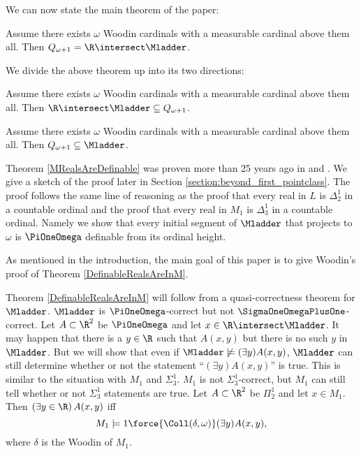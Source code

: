 \documentclass[oneside,12pt]{amsart}
\begin{document}
We can now state the main theorem of the paper:

\begin{theorem}
Assume there exists $\omega$ Woodin cardinals with a measurable cardinal above them all.
Then $Q_{\omega+1} = \R \intersect \Mladder$.
\end{theorem}

We divide the above theorem up into its two directions:

\begin{theorem}
\label{MRealsAreDefinable}
Assume there exists $\omega$ Woodin cardinals with a measurable cardinal above them all.
Then $\R \intersect \Mladder \subseteq Q_{\omega+1}$.
\end{theorem}

\begin{theorem}
\label{DefinableRealsAreInM}
Assume there exists $\omega$ Woodin cardinals with a measurable cardinal above them all.
Then $Q_{\omega+1} \subseteq \Mladder$.
\end{theorem}

Theorem \ref{MRealsAreDefinable} was proven more than 25 years ago in
\cite{My_Thesis} and \cite{Mouse_Sets}. We give a sketch of the proof later
in Section \ref{section:beyond_first_pointclass}. The proof follows the same
line of reasoning as the proof that every real in $L$ is $\Delta^1_2$ in a
countable ordinal and the proof that every real in $M_1$ is $\Delta^1_3$ in
a countable ordinal. Namely we show that every initial segment of $\Mladder$
that projects to $\omega$ is $\PiOneOmega$ definable from its ordinal height.

As mentioned in the introduction, the main goal of this paper is to give Woodin's proof of Theorem \ref{DefinableRealsAreInM}.

Theorem \ref{DefinableRealsAreInM} will follow from a quasi-correctness theorem
for $\Mladder$. $\Mladder$ is $\PiOneOmega$-correct but not $\SigmaOneOmegaPlusOne$-correct.
Let $A\subset\R^2$ be $\PiOneOmega$ and let $x\in\R\intersect\Mladder$. It may
happen that there is a $y\in \R$ such that $A(x,y)$ but there is no such $y$
in $\Mladder$. But we will show that even if $\Mladder\not\models(\exists y) A(x,y)$,
$\Mladder$ can still determine whether or not the statement
``$(\exists y) A(x,y)$'' is true. This is similar to the situation with $M_1$ and
$\Sigma^1_3$. $M_1$ is not $\Sigma^1_3$-correct, but $M_1$ can still tell whether
or not $\Sigma^1_3$ statements are true. Let $A\subset\R^2$ be $\Pi^1_2$ and
let $x\in M_1$. Then $(\exists y\in\R)\, A(x,y)$ iff
$$M_1\models 1\force{\Coll(\delta,\omega)} (\exists y) A(x,y),$$
where $\delta$ is the Woodin of $M_1$.
\end{document}

